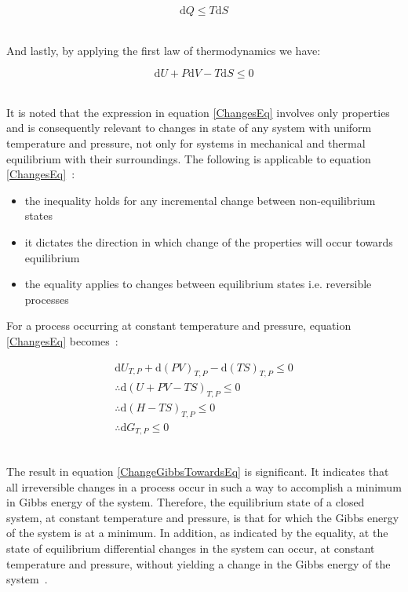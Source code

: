 \begin{equation}
\mathrm{d}Q \leq T \mathrm{d}S
\end{equation}\

And lastly, by applying the first law of thermodynamics we have:\

\begin{equation}
\mathrm{d}U + P \mathrm{d}V - T \mathrm{d}S \leq 0 \label{ChangesEq}
\end{equation}\

It is noted that the expression in equation \ref{ChangesEq} involves only properties and is consequently relevant to changes in state of any system with uniform temperature and pressure, not only for systems in mechanical and thermal equilibrium with their surroundings. The following is applicable to equation \ref{ChangesEq}~\cite{ SmithNessAbbott}:\

\begin{itemize}
\item the inequality holds for any incremental change between non-equilibrium states
\item it dictates the direction in which change of the properties will occur towards equilibrium
\item the equality applies to changes between equilibrium states i.e. reversible processes
\end{itemize}

For a process occurring at constant temperature and pressure, equation \ref{ChangesEq} becomes~\cite{ SmithNessAbbott}:\

\begin{eqnarray}
\mathrm{d}U_{T, P} +  \mathrm{d}\left(PV\right)_{T, P} - \mathrm{d}\left(TS\right)_{T, P} \leq 0 \\
\therefore \mathrm{d}\left(U + PV - TS\right)_{T,P} \leq 0 \\
\therefore \mathrm{d}\left(H - TS\right)_{T,P} \leq 0 \\
\therefore \mathrm{d} G_{T,P} \leq 0 \label{ChangeGibbsTowardsEq}
\end{eqnarray}\

The result in equation \ref{ChangeGibbsTowardsEq} is significant. It indicates that all irreversible changes in a process occur in such a way to accomplish a minimum in Gibbs energy of the system. Therefore, the equilibrium state of a closed system, at constant temperature and pressure, is that for which the Gibbs energy of the system is at a minimum. In addition, as indicated by the equality, at the state of equilibrium differential changes in the system can occur, at constant temperature and pressure, without yielding a change in the Gibbs energy of the system~\cite{ SmithNessAbbott, Dechema, SolidLiquidStability}.\\


